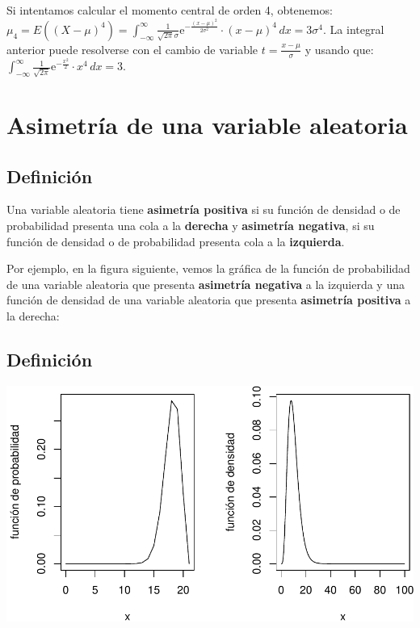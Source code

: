 \documentclass[]{book}
\begin{document}
Si intentamos calcular el momento central de orden 4, obtenemos:
\(\mu_4 = E\left((X-\mu)^4\right)=\int_{-\infty}^\infty \frac{1}{\sqrt{2\pi}\sigma}\mathrm{e}^{-\frac{(x-\mu)^2}{2\sigma^2}}\cdot (x-\mu)^4\, dx = 3\sigma^4.\) La integral anterior puede resolverse con el cambio de variable \(t=\frac{x-\mu}{\sigma}\) y usando que: \(\int_{-\infty}^\infty \frac{1}{\sqrt{2\pi}}\mathrm{e}^{-\frac{x^2}{2}}\cdot x^4\, dx = 3.\)

\hypertarget{asimetruxeda-de-una-variable-aleatoria}{%
\section{Asimetría de una variable aleatoria}\label{asimetruxeda-de-una-variable-aleatoria}}

\hypertarget{definiciuxf3n}{%
\subsection{Definición}\label{definiciuxf3n}}

Una variable aleatoria tiene \textbf{asimetría positiva} si su función de densidad o de probabilidad presenta una cola a la
\textbf{derecha} y \textbf{asimetría negativa}, si su función de densidad o de probabilidad presenta cola a la \textbf{izquierda}.

Por ejemplo, en la figura siguiente, vemos la gráfica de la función de probabilidad de una variable aleatoria que presenta \textbf{asimetría negativa} a la izquierda y una función de densidad de una variable aleatoria que presenta \textbf{asimetría positiva} a la derecha:

\hypertarget{definiciuxf3n-1}{%
\subsection{Definición}\label{definiciuxf3n-1}}

\includegraphics{curso-probabilidad-udemy_files/figure-latex/unnamed-chunk-103-1.pdf}
\end{document}
